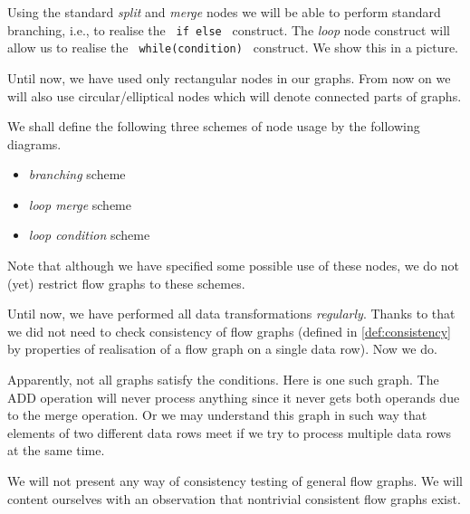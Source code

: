 Using the standard \emph{split} and \emph{merge} nodes we will be able to perform standard branching, i.e., to realise the \texttt{ if \string{\string} else \string{\string} } construct. The \emph{loop} node construct will allow us to realise the \texttt{ while(condition) \string{\string} } construct. We show this in a picture.

\begin{rem}
  Until now, we have used only rectangular nodes in our graphs. From now on we will also use circular/elliptical nodes which will denote connected parts of graphs.
\end{rem}

We shall define the following three schemes of node usage by the following diagrams.
\begin{itemize}
  \item \emph{branching} scheme
  \item \emph{loop merge} scheme
  \item \emph{loop condition} scheme
\end{itemize}
\myenddef

\begin{rem}
  Note that although we have specified some possible use of these nodes, we do not (yet) restrict flow graphs to these schemes.
\end{rem}

Until now, we have performed all data transformations \emph{regularly}. Thanks to that we did not need to check consistency of flow graphs (defined in \ref{def:consistency} by properties of realisation of a flow graph on a single data row). Now we do.

Apparently, not all graphs satisfy the conditions. Here is one such graph. The ADD operation will never process anything since it never gets both operands due to the merge operation. Or we may understand this graph in such way that elements of two different data rows meet if we try to process multiple data rows at the same time.


We will not present any way of consistency testing of general flow graphs. We will content ourselves with an observation that nontrivial consistent flow graphs exist.


